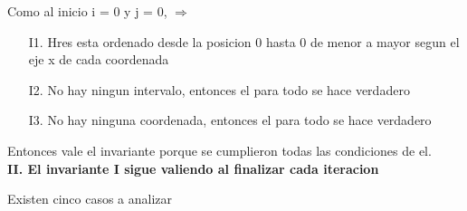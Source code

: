 Como al inicio i = 0 y j = 0, $\Rightarrow$ 
\begin{itemize}
\item[I1.] Hres esta ordenado desde la posicion 0 hasta 0 de menor a mayor segun el eje x de cada coordenada
\item[I2.] No hay ningun intervalo, entonces el para todo se hace verdadero
\item[I3.] No hay ninguna coordenada, entonces el para todo se hace verdadero
\end{itemize}
Entonces vale el invariante porque se cumplieron todas las condiciones de el.\\

\noindent \textbf{II. El invariante I sigue valiendo al finalizar cada iteracion}


Existen cinco casos a analizar\\
